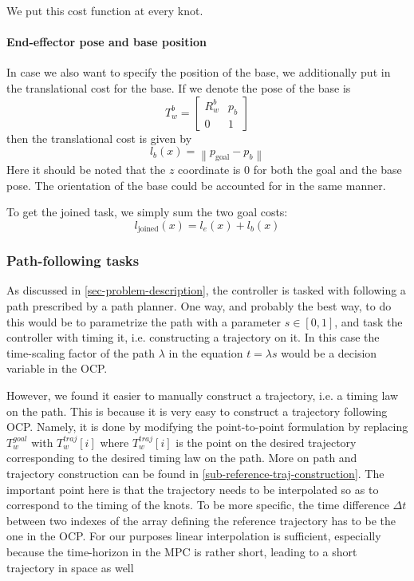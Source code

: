 \documentclass{article}
\begin{document}
We put this cost function at every knot.

\paragraph{End-effector pose and base position}
In case we also want to specify the position of the base,
we additionally put in the translational cost for the base.
If we denote the pose of the base is 
\begin{equation}
T_{ w }^{ b } = \begin{bmatrix} 
		R_{ w }^{ b } & p_{ b } \\
		0 & 1
\end{bmatrix} 
\end{equation}
then the translational cost is given by
\begin{equation}
		l_{ b } (x) = \left\lVert   p_{ \text{goal} } - p_{ b } \right \rVert
\end{equation}
Here it should be noted that the $ z  $ coordinate is 0 for
both the goal and the base pose.
The orientation of the base could be accounted for in the same manner.

To get the joined task, we simply sum the two goal costs:
\begin{equation}
l_{ \text{joined} } (x)= l_{e } (x) + l_{ b } (x)
\end{equation}

\subsubsection{Path-following tasks}
As discussed in \ref{sec-problem-description}, the controller is tasked with following 
a path prescribed by a path planner.
One way, and probably the best way,
to do this would be to parametrize the path with a parameter $ s \in [0,1] $, 
and task the controller
with timing it, i.e. constructing a trajectory on it. In this case the 
time-scaling factor of the path $ \lambda  $ in the equation
$ t = \lambda s   $ would be a decision variable in the OCP.

However, we found it easier to manually construct a trajectory, i.e. a timing law
on the path. This is because it is very easy to construct a trajectory following OCP.
Namely, it is done by modifying the point-to-point formulation by replacing
$ T_{ w }^{ goal }  $ with $ T_{ w }^{ traj } [i]  $ where 
$   T_{ w }^{ traj } [i]    $ is the point on the desired trajectory corresponding
to the desired timing law on the path. More on path and trajectory construction can
be found in \ref{sub-reference-traj-construction}.
The important point here is that the trajectory needs
to be interpolated so as to correspond to the timing of the knots.
To be more specific, the time difference $ \Delta t  $
between two indexes of the array defining the reference trajectory
has to be the one in the OCP.
For our purposes linear interpolation is sufficient,
especially because the time-horizon in the MPC is rather short,
leading to a short trajectory in space as well
\end{document}

